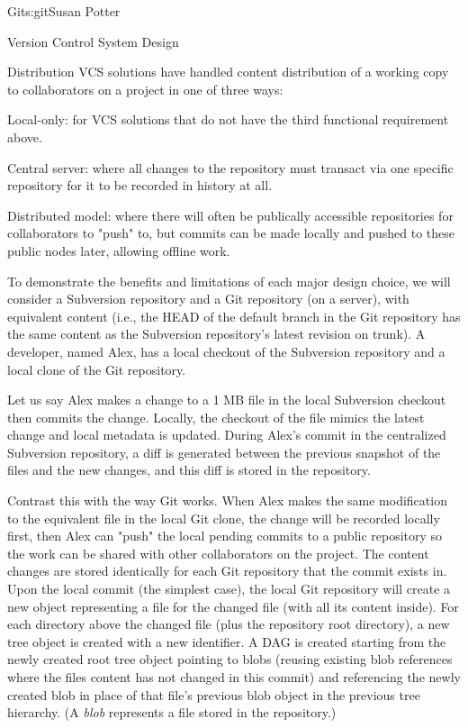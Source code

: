 \begin{aosachapter}{Git}{s:git}{Susan Potter}
\begin{aosasect1}{Version Control System Design}
\begin{aosasect2}{Distribution}
VCS solutions have handled content distribution of a working copy to collaborators on a
project in one of three ways:
\begin{aosaitemize}
  \item Local-only: for VCS solutions that do not have the
    third functional requirement above.
  \item Central server: where all changes to the repository must transact
    via one specific repository for it to be recorded in history at all.
  \item Distributed model: where there will often be publically accessible
    repositories for collaborators to "push" to, but commits can be made
    locally and pushed to these public nodes later, allowing offline work.
\end{aosaitemize}

\end{aosasect2}

To demonstrate the benefits and limitations of each major design choice,
 we will consider a Subversion repository and a Git repository
(on a server), with equivalent content (i.e., the HEAD of the default
branch in the Git repository has the same content as the Subversion
repository's latest revision on trunk). A developer, named Alex,
has a local checkout of the Subversion repository and a local clone of the
Git repository.

Let us say Alex makes a change to a 1 MB file in the local Subversion
checkout then commits the change. Locally, the checkout of the file mimics
the latest change and local metadata is updated. During Alex's commit in the centralized
Subversion repository, a diff is generated between the
previous snapshot of the files and the new changes, and this diff is stored
in the repository.

Contrast this with the way Git works.
When Alex makes the same modification to the equivalent file in the local
Git clone, the change will be recorded locally first, then Alex can "push"
the local pending commits to a public repository so the work can be shared
with other collaborators on the project. The content changes are
stored identically for each Git repository that the commit exists in. Upon
the local commit (the simplest case), the local Git repository will create a
new object representing a file for the changed file (with all its content
inside). For each directory above the changed file (plus the repository
root directory), a new tree object is created with a new identifier. A DAG
is created starting from the newly created root tree object pointing to
blobs (reusing existing blob references where the files content has not
changed in this commit) and referencing the newly created blob in place
of that file's previous blob object in the previous tree hierarchy. 
(A \emph{blob} represents
a file stored in the repository.) 


\end{aosasect1}
\end{aosachapter}

